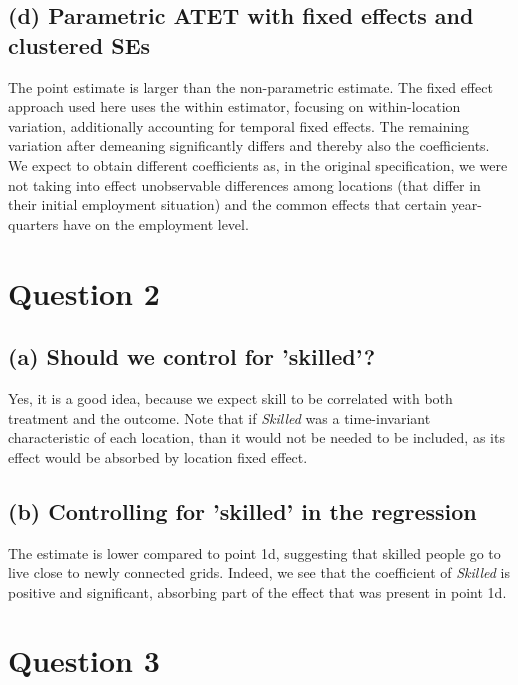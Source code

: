 \documentclass{scrartcl}
\begin{document}
\subsection*{(d) Parametric ATET with fixed effects and clustered SEs}

The point estimate is larger than the non-parametric estimate. The fixed effect approach used here uses the within estimator, focusing on within-location variation, additionally accounting for temporal fixed effects. The remaining variation after demeaning significantly differs and thereby also the coefficients. We expect to obtain different coefficients as, in the original specification, we were not taking into effect unobservable differences among locations (that differ in their initial employment situation) and the common effects that certain year-quarters have on the employment level.  


\section*{Question 2}

\subsection*{(a) Should we control for 'skilled'?}


Yes, it is a good idea, because we expect skill to be correlated with both treatment and the outcome. Note that if \textit{Skilled} was a time-invariant characteristic of each location, than it would not be needed to be included, as its effect would be absorbed by location fixed effect. 

\subsection*{(b) Controlling for 'skilled' in the regression}

The estimate is lower compared to point 1d, suggesting that skilled people go to live close to newly connected grids. Indeed, we see that the coefficient of \textit{Skilled} is positive and significant, absorbing part of the effect that was present in point 1d.

\section*{Question 3}
\end{document}
